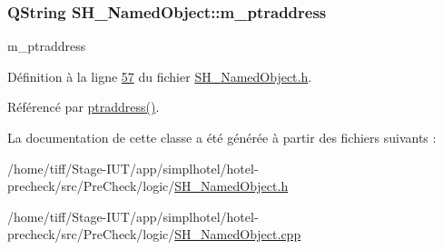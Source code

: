 \hypertarget{classSH__NamedObject_acfc489299f90750082785bf9ac42f4ff}{
\subsubsection[{m\-\_\-ptraddress}]{\setlength{\rightskip}{0pt plus 5cm}Q\-String S\-H\-\_\-\-Named\-Object\-::m\-\_\-ptraddress\hspace{0.3cm}{\ttfamily [private]}}}\label{classSH__NamedObject_acfc489299f90750082785bf9ac42f4ff}


m\-\_\-ptraddress 



Définition à la ligne \hyperlink{SH__NamedObject_8h_source_l00057}{57} du fichier \hyperlink{SH__NamedObject_8h_source}{S\-H\-\_\-\-Named\-Object.\-h}.



Référencé par \hyperlink{classSH__NamedObject_a147d0e52d9f0fc1d3a423d02f82325f5}{ptraddress()}.



La documentation de cette classe a été générée à partir des fichiers suivants \-:\begin{DoxyCompactItemize}
\item 
/home/tiff/\-Stage-\/\-I\-U\-T/app/simplhotel/hotel-\/precheck/src/\-Pre\-Check/logic/\hyperlink{SH__NamedObject_8h}{S\-H\-\_\-\-Named\-Object.\-h}\item 
/home/tiff/\-Stage-\/\-I\-U\-T/app/simplhotel/hotel-\/precheck/src/\-Pre\-Check/logic/\hyperlink{SH__NamedObject_8cpp}{S\-H\-\_\-\-Named\-Object.\-cpp}\end{DoxyCompactItemize}
